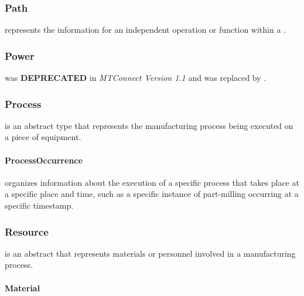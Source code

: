\subsubsection{Path}
\label{sec:Path}



 represents the information for an independent operation or function within a .



\subsubsection{Power}
\label{sec:Power}



 was \textbf{DEPRECATED} in \textit{MTConnect Version 1.1} and was replaced by .



\subsubsection{Process}
\label{sec:Process}



 is an abstract  type that represents the manufacturing process being executed on a piece of equipment.




\paragraph{ProcessOccurrence}\mbox{}
\label{sec:ProcessOccurrence}


 \glspl{organize} information about the execution of a specific process that takes place at a specific place and time, such as a specific instance of part-milling occurring at a specific timestamp.



\subsubsection{Resource}
\label{sec:Resource}



 is an abstract  that represents materials or personnel involved in a manufacturing process.



\paragraph{Material}\mbox{}
\label{sec:Material}



